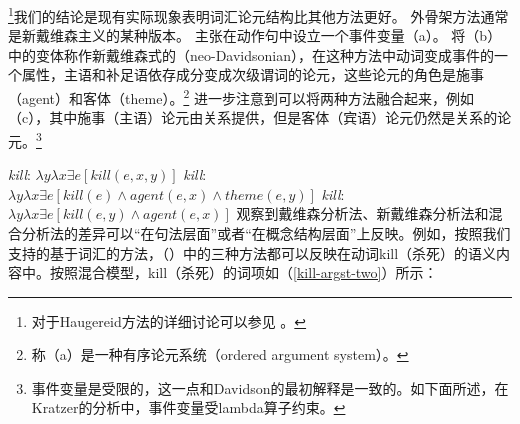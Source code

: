 \footnote{%
对于Haugereid方法的详细讨论可以参见 。%
}我们的结论是现有实际现象表明词汇论元结构比其他方法更好。 
外骨架方法通常是新戴维森主义的某种版本。 \citet{Davidson67a-u}主张在动作句中设立一个事件变量（a）。 \citet{Dowty89b-u}将（b）中的变体称作新戴维森式的（neo-Davidsonian），在这种方法中动词变成事件的一个属性，主语和补足语依存成分变成次级谓词的论元，这些论元的角色是施事（agent）和客体（theme）。\footnote{%
 \citet{Dowty89b-u}称（a）是一种有序论元系统（ordered argument system）。
}  \citet{Kratzer96a}进一步注意到可以将两种方法融合起来，例如（c），其中施事（主语）论元由关系提供，但是客体（宾语）论元仍然是关系的论元。\footnote{%
事件变量是受限的，这一点和Davidson的最初解释是一致的。如下面所述，在Kratzer的分析中，事件变量受lambda算子约束。} 

\eal\settowidth{} \label{neokill1}
\ex \emph{kill}: $\lambda y\lambda x\exists e[kill(e, x, y)]$  
\ex \emph{kill}: $\lambda y\lambda x\exists e[kill(e) \wedge agent(e, x) \wedge theme(e, y)]$ 
\ex \emph{kill}: $\lambda y\lambda x\exists e[kill(e,y) \wedge agent(e, x)]$ 
\zl
 \citet{Kratzer96a}观察到戴维森分析法、新戴维森分析法和混合分析法的差异可以“在句法层面”或者“在概念结构层面”上反映\citep[--111]{Kratzer96a}。例如，按照我们支持的基于词汇的方法，（）中的三种方法都可以反映在动词kill（杀死）的语义内容中。按照混合模型，kill（杀死）的词项如（\ref{kill-argst-two}）所示：

